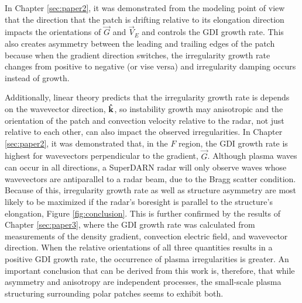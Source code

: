 

In Chapter \ref{sec:paper2}, it was demonstrated from the modeling point of view that the direction that the patch is drifting relative to its elongation direction impacts the orientations of \(\vec{G}\) and \(\vec{V}_E\) and controls the GDI growth rate.  This also creates asymmetry between the leading and trailing edges of the patch because when the gradient direction switches, the irregularity growth rate changes from positive to negative (or vise versa) and irregularity damping occurs instead of growth.  

Additionally, linear theory predicts that the irregularity growth rate is depends on the wavevector direction, \(\mathbf{\hat{k}}\), so instability growth may anisotropic and the orientation of the patch and convection velocity relative to the radar, not just relative to each other, can also impact the observed irregularities.  In Chapter \ref{sec:paper2}, it was demonstrated that, in the \(F\) region, the GDI growth rate is highest for wavevectors perpendicular to the gradient, \(\vec{G}\).  Although plasma waves can occur in all directions, a SuperDARN radar will only observe waves whose wavevectors are antiparallel to a radar beam, due to the Bragg scatter condition.  Because of this, irregularity growth rate as well as structure asymmetry are most likely to be maximized if the radar's boresight is parallel to the structure's elongation, Figure \ref{fig:conclusion}.  This is further confirmed by the results of Chapter \ref{sec:paper3}, where the GDI growth rate was calculated from measurements of the density gradient, convection electric field, and wavevector direction.  When the relative orientations of all three quantities results in a positive GDI growth rate, the occurrence of plasma irregularities is greater.  An important conclusion that can be derived from this work is, therefore, that while asymmetry and anisotropy are independent processes, the small-scale plasma structuring surrounding polar patches seems to exhibit both.

